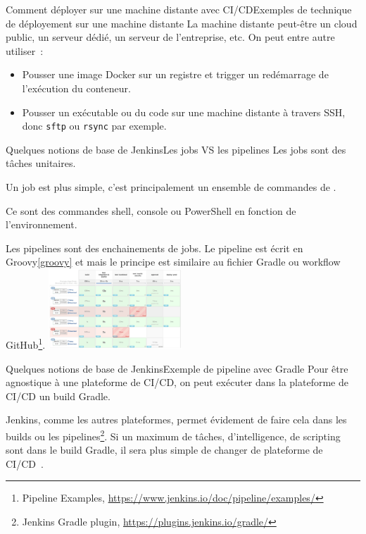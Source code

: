 \documentclass{beamer}
\begin{document}
    \begin{frame}{Comment déployer sur une machine distante avec CI/CD}{Exemples de technique de déployement sur une machine distante}
        \transdissolve
        La machine distante peut-être un cloud public, un serveur dédié, un serveur de l'entreprise, etc.
        \bigbreak
        On peut entre autre utiliser~:
        \begin{itemize}
            \item Pousser une image Docker sur un registre et trigger un redémarrage de l'exécution du conteneur.
            \item Pousser un exécutable ou du code sur une machine distante à travers SSH, donc \lstinline{sftp} ou \lstinline{rsync} par exemple.
        \end{itemize}
    \end{frame}

    \begin{frame}{Quelques notions de base de Jenkins}{Les jobs VS les pipelines}
        \transdissolve
        Les jobs sont des tâches unitaires.

        Un job est plus simple, c'est principalement un ensemble de commandes de .

        Ce sont des commandes shell, console ou PowerShell en fonction de l'environnement.

        \bigbreak
        Les pipelines sont des enchainements de jobs.
        Le pipeline est écrit en Groovy\cref{groovy} et mais le principe est similaire au fichier Gradle ou workflow GitHub\footnote{Pipeline Examples, \url{https://www.jenkins.io/doc/pipeline/examples/}}.
        \bigbreak
        \centering
        \includegraphics[width=5cm]{image/jenkins-pipeline}
    \end{frame}

    \begin{frame}{Quelques notions de base de Jenkins}{Exemple de pipeline avec Gradle}
        \transdissolve
        Pour être agnostique à une plateforme de CI/CD, on peut exécuter dans la plateforme de CI/CD un build Gradle.

        Jenkins, comme les autres plateformes, permet évidement de faire cela dans les builds ou les pipelines\footnote{Jenkins Gradle plugin, \url{https://plugins.jenkins.io/gradle/}}.
        \bigbreak
        Si un maximum de tâches, d'intelligence, de scripting sont dans le build Gradle, il sera plus simple de changer de plateforme de CI/CD~.
    \end{frame}
\end{document}
